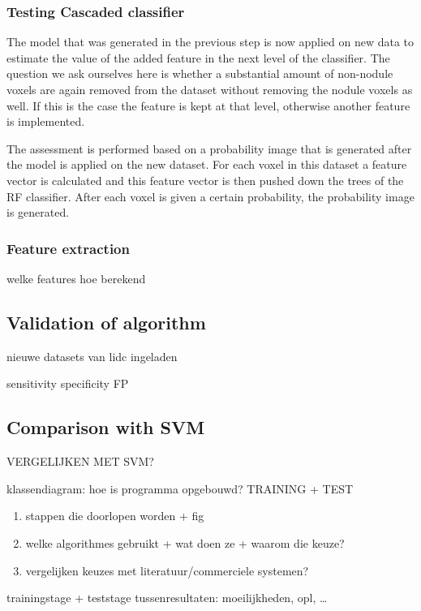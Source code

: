 
\subsubsection{Testing Cascaded classifier}
The model that was generated in the previous step is now applied on new data to
estimate the value of the added feature in the next level of the classifier.
The question we ask ourselves here is whether a substantial amount of
non-nodule voxels are again removed from the dataset without removing the nodule
voxels as well. If this is the case the feature is kept at that level, otherwise
another feature is implemented.

The assessment is performed based on a probability image that is generated after
the model is applied on the new dataset. For each voxel in this dataset a
feature vector is calculated and this feature vector is then pushed down the
trees of the RF classifier. After each voxel is given a certain probability, the
probability image is generated.


\subsubsection{Feature extraction} \label{sec:featureExtraction}


welke features
hoe berekend

\subsection{Validation of algorithm}
nieuwe datasets van lidc ingeladen

sensitivity
specificity
FP


\subsection{Comparison with SVM}

VERGELIJKEN MET SVM?






klassendiagram: hoe is programma opgebouwd?
TRAINING + TEST
\begin{enumerate}
\item stappen die doorlopen worden + fig
\item welke algorithmes gebruikt + wat doen ze + waarom die keuze?
\item vergelijken keuzes met literatuur/commerciele systemen?
\end{enumerate}


trainingstage + teststage
tussenresultaten: moeilijkheden, opl, \ldots


